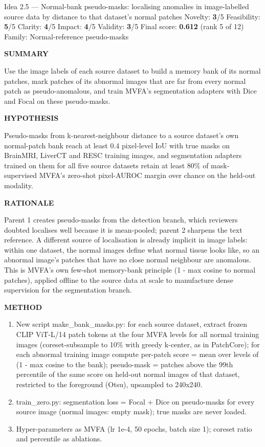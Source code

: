 \documentclass[11pt,a4paper]{article}
\newcommand{\lbl}[1]{{\sffamily\footnotesize\bfseries\color{muted}\MakeUppercase{#1}}\par}
\begin{document}
\begin{ideabox}{Idea 2.5 — Normal-bank pseudo-masks: localising anomalies in image-labelled source data by distance to that dataset's normal patches}
{\small Novelty: \textbf{3}/5 \quad Feasibility: \textbf{5}/5 \quad Clarity: \textbf{4}/5 \quad Impact: \textbf{4}/5 \quad Validity: \textbf{3}/5 \quad Final score: \textbf{0.612} (rank 5 of 12) \quad Family: Normal-reference pseudo-masks}\par\smallskip
\lbl{Summary}Use the image labels of each source dataset to build a memory bank of its normal patches, mark patches of its abnormal images that are far from every normal patch as pseudo-anomalous, and train MVFA's segmentation adapters with Dice and Focal on these pseudo-masks.

\lbl{Hypothesis}Pseudo-masks from k-nearest-neighbour distance to a source dataset's own normal-patch bank reach at least 0.4 pixel-level IoU with true masks on BrainMRI, LiverCT and RESC training images, and segmentation adapters trained on them for all five source datasets retain at least 80\% of mask-supervised MVFA's zero-shot pixel-AUROC margin over chance on the held-out modality.

\lbl{Rationale}Parent 1 creates pseudo-masks from the detection branch, which reviewers doubted localises well because it is mean-pooled; parent 2 sharpens the text reference. A different source of localisation is already implicit in image labels: within one dataset, the normal images define what normal tissue looks like, so an abnormal image's patches that have no close normal neighbour are anomalous. This is MVFA's own few-shot memory-bank principle (1 - max cosine to normal patches), applied offline to the source data at scale to manufacture dense supervision for the segmentation branch.

\lbl{Method}\begin{enumerate}[leftmargin=1.6em,itemsep=1pt,topsep=2pt]
\item New script make\_\allowbreak{}bank\_\allowbreak{}masks.py: for each source dataset, extract frozen CLIP ViT-L/14 patch tokens at the four MVFA levels for all normal training images (coreset-subsample to 10\% with greedy k-center, as in PatchCore); for each abnormal training image compute per-patch score = mean over levels of (1 - max cosine to the bank); pseudo-mask = patches above the 99th percentile of the same score on held-out normal images of that dataset, restricted to the foreground (Otsu), upsampled to 240x240.
\item train\_\allowbreak{}zero.py: segmentation loss = Focal + Dice on pseudo-masks for every source image (normal images: empty mask); true masks are never loaded.
\item Hyper-parameters as MVFA (lr 1e-4, 50 epochs, batch size 1); coreset ratio and percentile as ablations.
\end{enumerate}


\end{ideabox}
\end{document}
